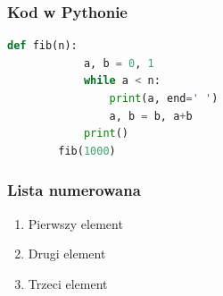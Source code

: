 \documentclass[polish]{beamer}
\begin{document}
\begin{frame}[fragile]
    \frametitle{Kod w Pythonie}
    \begin{lstlisting}[language=Python]
        def fib(n):
            a, b = 0, 1
            while a < n:
                print(a, end=' ')
                a, b = b, a+b
            print()
        fib(1000)
    \end{lstlisting}
\end{frame}

\begin{frame}
    \frametitle{Lista numerowana}
    \begin{enumerate}
        \item Pierwszy element
        \item Drugi element
        \item Trzeci element
    \end{enumerate}
    
\end{frame}
\end{document}
